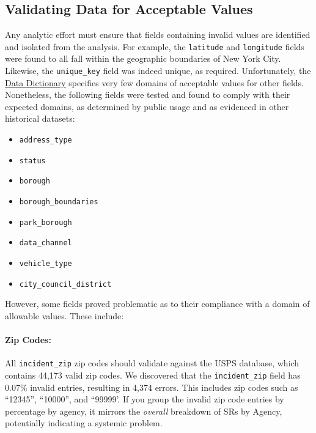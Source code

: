 \documentclass[linenumber]{jdsart}
\begin{document}
\subsection{Validating Data for Acceptable Values}
\label{sec:domain}
Any analytic effort must ensure that fields containing invalid values 
are identified and isolated from the analysis. For example, the \texttt{latitude} 
and \texttt{longitude} fields were found to all fall within the 
geographic boundaries of New York City. Likewise, 
the \texttt{unique\_key} field was indeed unique, as required. 
Unfortunately, the \href{https://data.cityofnewyork.us/api/views/erm2-nwe9/files/b372b884-f86a-453b-ba16-1fe06ce9d212?download=true&filename=311_ServiceRequest_2010-Present_DataDictionary_Updated_2023.xlsx}{Data Dictionary} specifies very few domains of 
acceptable values for other fields. Nonetheless, the following fields were tested and found to comply with their expected domains, as determined by public 
usage and as evidenced in other historical datasets:

\begin{itemize}[left=1.5em]
    \item \texttt{address\_type}
    \item \texttt{status}
    \item \texttt{borough}
    \item \texttt{borough\_boundaries}
    \item \texttt{park\_borough}
    \item \texttt{data\_channel}
    \item \texttt{vehicle\_type}
    \item \texttt{city\_council\_district}
\end{itemize}

However,  some fields proved problematic as to their 
compliance with a domain of allowable values. These include: 

\paragraph{Zip Codes:}
\label{sec:zipcodesissues}
All \texttt{incident\_zip} zip codes should 
validate against the USPS database, which contains 
44,173 valid zip codes. We discovered that the \texttt{incident\_zip} 
field has 0.07\% invalid entries, resulting in 4,374 errors. This includes
zip codes such as ``12345'', ``10000'', and ``99999'. If you group 
the invalid zip code entries by percentage by agency, it 
mirrors the \textit{overall} breakdown of SRs by Agency, potentially 
indicating a systemic problem.
\end{document}
